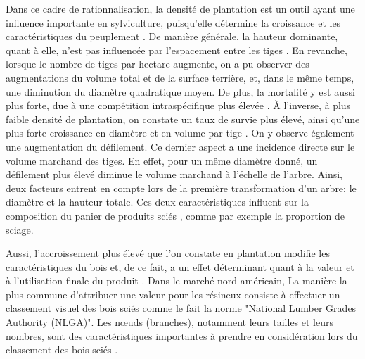 \documentclass[letterpaper, 12pt]{article}
\begin{document}
\begin{onehalfspace}
Dans ce cadre de rationnalisation, la densité de plantation est un outil ayant une influence importante en sylviculture, puisqu'elle détermine la croissance et les caractéristiques du peuplement \cite{Thiffault2003}. De manière générale, la hauteur dominante, quant à elle, n'est pas influencée par l'espacement entre les tiges \cite{Gizachew2012}. En revanche, lorsque le nombre de tiges par hectare augmente, on a pu observer des augmentations du volume total et de la surface terrière, et, dans le même temps, une diminution du diamètre quadratique moyen. De plus, la mortalité y est aussi plus forte, due à une compétition intraspécifique plus élevée \cite{Groot2016, Will2010}. À l'inverse, à plus faible densité de plantation, on constate un taux de survie plus élevé, ainsi qu'une plus forte croissance en diamètre et en volume par tige \cite{Akers2013}. On y observe également une augmentation du défilement. Ce dernier aspect a une incidence directe sur le volume marchand des tiges. En effet, pour un même diamètre donné, un défilement plus élevé diminue le volume marchand à l'échelle de l'arbre\cite{Pregent1998}. %
Ainsi, deux facteurs entrent en compte lors de la première transformation d'un arbre: le diamètre et la hauteur totale. Ces deux caractéristiques influent sur la composition du panier de produits sciés \cite{Auty2014}, comme par exemple la proportion de sciage. 

\vspace{12pt}

Aussi, l'accroissement plus élevé que l'on constate en plantation modifie les caractéristiques du bois et, de ce fait, a un effet déterminant quant à la valeur et à l'utilisation finale du produit \cite{Zhang2002}. Dans le marché nord-américain, La manière la plus commune d'attribuer une valeur pour les résineux consiste à effectuer un classement visuel des bois sciés comme le fait la norme "National Lumber Grades Authority (NLGA)". Les nœuds (branches), notamment leurs tailles et leurs nombres, sont des caractéristiques importantes à prendre en considération lors du classement des bois sciés \cite{Lemieux2000}. 

\vspace{12pt}


\end{onehalfspace}
\end{document}
